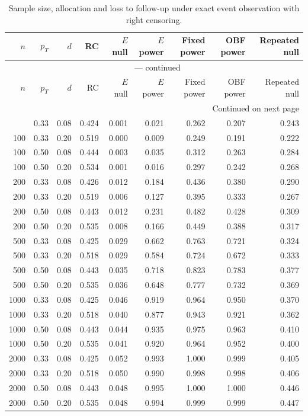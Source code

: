 \documentclass[12pt]{article}
\theoremstyle{definition}
\theoremstyle{remark}
\begin{document}
\endgroup

\begingroup
\scriptsize
\setlength{\tabcolsep}{3pt}
\renewcommand{\arraystretch}{1.10}
\setlength{\LTcapwidth}{\textwidth}
\begin{longtable}{rrrrrrrrr}
\caption{Sample size, allocation and loss to follow-up under exact event observation with right censoring.}\label{tab:design-exact}\\
\toprule
$n$ & $p_T$ & $d$ & RC & $E$ null & $E$ power & Fixed power & OBF power & Repeated null \\
\midrule
\endfirsthead
\multicolumn{9}{c}{\tablename\ \thetable{} --- continued}\\
\toprule
$n$ & $p_T$ & $d$ & RC & $E$ null & $E$ power & Fixed power & OBF power & Repeated null \\
\midrule
\endhead
\midrule
\multicolumn{9}{r}{Continued on next page}\\
\endfoot
\bottomrule
\endlastfoot
100 & 0.33 & 0.08 & 0.424 & 0.001 & 0.021 & 0.262 & 0.207 & 0.243 \\
100 & 0.33 & 0.20 & 0.519 & 0.000 & 0.009 & 0.249 & 0.191 & 0.222 \\
100 & 0.50 & 0.08 & 0.444 & 0.003 & 0.035 & 0.312 & 0.263 & 0.284 \\
100 & 0.50 & 0.20 & 0.534 & 0.001 & 0.016 & 0.297 & 0.242 & 0.268 \\
200 & 0.33 & 0.08 & 0.426 & 0.012 & 0.184 & 0.436 & 0.380 & 0.290 \\
200 & 0.33 & 0.20 & 0.519 & 0.006 & 0.127 & 0.395 & 0.333 & 0.267 \\
200 & 0.50 & 0.08 & 0.443 & 0.012 & 0.231 & 0.482 & 0.428 & 0.309 \\
200 & 0.50 & 0.20 & 0.535 & 0.008 & 0.166 & 0.449 & 0.388 & 0.317 \\
500 & 0.33 & 0.08 & 0.425 & 0.029 & 0.662 & 0.763 & 0.721 & 0.324 \\
500 & 0.33 & 0.20 & 0.518 & 0.029 & 0.584 & 0.724 & 0.672 & 0.333 \\
500 & 0.50 & 0.08 & 0.443 & 0.035 & 0.718 & 0.823 & 0.783 & 0.377 \\
500 & 0.50 & 0.20 & 0.535 & 0.036 & 0.648 & 0.777 & 0.732 & 0.369 \\
1000 & 0.33 & 0.08 & 0.425 & 0.046 & 0.919 & 0.964 & 0.950 & 0.370 \\
1000 & 0.33 & 0.20 & 0.518 & 0.040 & 0.877 & 0.943 & 0.921 & 0.362 \\
1000 & 0.50 & 0.08 & 0.443 & 0.044 & 0.935 & 0.975 & 0.963 & 0.410 \\
1000 & 0.50 & 0.20 & 0.535 & 0.041 & 0.920 & 0.964 & 0.952 & 0.400 \\
2000 & 0.33 & 0.08 & 0.425 & 0.052 & 0.993 & 1.000 & 0.999 & 0.405 \\
2000 & 0.33 & 0.20 & 0.518 & 0.050 & 0.990 & 0.998 & 0.998 & 0.406 \\
2000 & 0.50 & 0.08 & 0.443 & 0.048 & 0.995 & 1.000 & 1.000 & 0.446 \\
2000 & 0.50 & 0.20 & 0.535 & 0.048 & 0.994 & 0.999 & 0.999 & 0.447 \\
\end{longtable}
\endgroup
\end{document}
